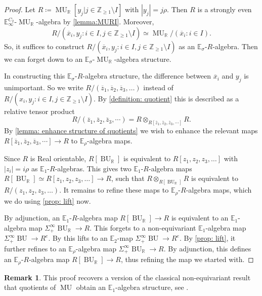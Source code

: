 \documentclass[a4paper, 10pt]{article}
\newcommand{\E}{\mathbb E}  %
\newcommand{\Z}{\mathbb{Z}}
\newcommand{\MU}{\operatorname{MU}}
\newcommand{\MUR}{{\MU_{\mathbb{R}}}}
\newcommand{\BU}{\operatorname{BU}}
\newcommand{\BUR}{{\BU_{\mathbb{R}}}}
\newcommand{\ol}{\overline}
\theoremstyle{definition}
\newtheorem{remark}[remark]{Remark}
\begin{document}
\begin{proof}
Let \(R \coloneqq \MUR[y_j\vert j\in \Z_{\geq 1}\setminus I]\) with \(|y_j| = j\rho\). 
Then \(R\) is a strongly even \(\E^{C_2}_\infty\)-\(\MUR\)-algebra by \cref{lemma:MURI}.
Moreover, 
\[ R/(\ol{x}_i,y_j: i\in I, j\in\Z_{\geq 1}\setminus I) \simeq \MUR/(\ol{x}_i :i\in I). \]
So, it suffices to construct \(R/(\ol{x}_i,y_j: i\in I, j\in\Z_{\geq 1}\setminus I)\) as an \(\E_\sigma\)-\(R\)-algebra. Then we can forget down to an \(\E_\sigma\)-\(\MUR\)-algebra structure.

In constructing this \(\E_\sigma\)-\(R\)-algebra structure, the difference between \(\ol{x}_i\) and \(y_j\) is unimportant. So we write \(R/(\overline{z}_1,\overline{z}_2,\overline{z}_3,\ldots)\) instead of \(R/(x_i,y_j: i\in I, j\in\Z_{\geq 1}\setminus I)\). By \cref{definition: quotient} this is described as a relative tensor product
\[ R/(\ol{z}_1, \ol{z}_2, \ol{z}_3, \cdots) = R \otimes_{R[\ol{z}_1, \ol{z}_2, \ol{z}_3, \cdots]} R. \]
By \cref{lemma: enhance structure of quotients} we wish to enhance the relevant maps $R[\ol{z}_1, \ol{z}_2, \ol{z}_3, \cdots] \to R$ to $\E_{\rho}$-algebra maps.

Since \(R\) is Real orientable, \(R[\BUR]\) is equivalent to \(R[z_1,z_2,z_3,\ldots]\) with $|z_{i}| = i\rho$ as $\E_1$-$R$-algebras. 
This gives two \(\E_1\)-\(R\)-algebra maps \(R[\BUR]\simeq R[z_1,z_2,z_3,\ldots] \to R\), such that \(R\otimes_{R[\BUR]}R\) is equivalent to \(R/(z_1,z_2,z_3,\ldots)\).
It remains to refine these maps to \(\E_\rho\)-\(R\)-algebra maps, which we do using \cref{prop: lift} now.


By adjunction, an \(\E_1\)-\(R\)-algebra map \(R[\BUR]\to R\) is equivalent to an \(\E_1\)-algebra map \(\Sigma^\infty_+\BUR \to R\). This forgets to a non-equivariant \(\E_1\)-algebra map \(\Sigma^\infty_+\BU\to R^e\). By  \cite[Theorem 7.1]{HahnYuan} this lifts to an \(\E_2\)-map \(\Sigma^\infty_+\BU\to R^e\). By \cref{prop: lift}, it further refines to an \(\E_\rho\)-algebra map \(\Sigma^\infty_+\BUR \to R\).
By adjunction, this defines an \(\E_\rho\)-\(R\)-algebra map \(R[\BUR] \to R\), thus refining the map we started with.
\end{proof}

\begin{remark}
    This proof recovers a version of the classical non-equivariant result that quotients of $\MU$ obtain an $\E_1$-algebra structure, see \cite{hahn2018quotientsrings}.
\end{remark}
\end{document}
